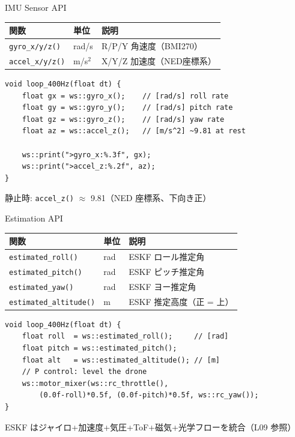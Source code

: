 \begin{frame}[fragile]{IMU Sensor API}
  \vspace{0.3em}
  {\small
  \begin{tabular}{lll}
    \hline
    \textbf{関数} & \textbf{単位} & \textbf{説明} \\
    \hline
    \texttt{gyro\_x/y/z()}  & rad/s   & R/P/Y 角速度（BMI270） \\
    \texttt{accel\_x/y/z()} & m/s$^2$ & X/Y/Z 加速度（NED座標系） \\
    \hline
  \end{tabular}
  }

  \vspace{0.3em}

  \begin{lstlisting}[style=sfcpp, basicstyle=\ttfamily\scriptsize]
void loop_400Hz(float dt) {
    float gx = ws::gyro_x();    // [rad/s] roll rate
    float gy = ws::gyro_y();    // [rad/s] pitch rate
    float gz = ws::gyro_z();    // [rad/s] yaw rate
    float az = ws::accel_z();   // [m/s^2] ~9.81 at rest

    ws::print(">gyro_x:%.3f", gx);
    ws::print(">accel_z:%.2f", az);
}
  \end{lstlisting}

  \vspace{0.2em}
  {\footnotesize 静止時: \texttt{accel\_z()} $\approx$ 9.81（NED 座標系、下向き正）}
\end{frame}

\begin{frame}[fragile]{Estimation API}
  \vspace{0.3em}
  {\small
  \begin{tabular}{lll}
    \hline
    \textbf{関数} & \textbf{単位} & \textbf{説明} \\
    \hline
    \texttt{estimated\_roll()}     & rad & ESKF ロール推定角 \\
    \texttt{estimated\_pitch()}    & rad & ESKF ピッチ推定角 \\
    \texttt{estimated\_yaw()}      & rad & ESKF ヨー推定角 \\
    \texttt{estimated\_altitude()} & m   & ESKF 推定高度（正 = 上） \\
    \hline
  \end{tabular}
  }

  \vspace{0.3em}

  \begin{lstlisting}[style=sfcpp, basicstyle=\ttfamily\scriptsize]
void loop_400Hz(float dt) {
    float roll  = ws::estimated_roll();     // [rad]
    float pitch = ws::estimated_pitch();
    float alt   = ws::estimated_altitude(); // [m]
    // P control: level the drone
    ws::motor_mixer(ws::rc_throttle(),
        (0.0f-roll)*0.5f, (0.0f-pitch)*0.5f, ws::rc_yaw());
}
  \end{lstlisting}

  \vspace{0.2em}
  {\footnotesize ESKF はジャイロ+加速度+気圧+ToF+磁気+光学フローを統合（L09 参照）}
\end{frame}

